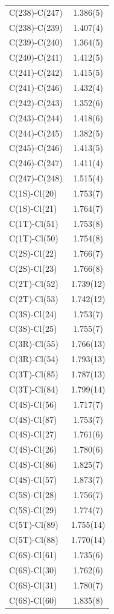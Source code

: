 \begin{center}
{\begin{supertabular}{p{1.5in}c}
C(238)-C(247) &1.386(5)\\
C(238)-C(239) &1.407(4)\\
C(239)-C(240) &1.364(5)\\
C(240)-C(241) &1.412(5)\\
C(241)-C(242) &1.415(5)\\
C(241)-C(246) &1.432(4)\\
C(242)-C(243) &1.352(6)\\
C(243)-C(244) &1.418(6)\\
C(244)-C(245) &1.382(5)\\
C(245)-C(246) &1.413(5)\\
C(246)-C(247) &1.411(4)\\
C(247)-C(248) &1.515(4)\\
C(1S)-Cl(20) &1.753(7)\\
C(1S)-Cl(21) &1.764(7)\\
C(1T)-Cl(51) &1.753(8)\\
C(1T)-Cl(50) &1.754(8)\\
C(2S)-Cl(22) &1.766(7)\\
C(2S)-Cl(23) &1.766(8)\\
C(2T)-Cl(52) &1.739(12)\\
C(2T)-Cl(53) &1.742(12)\\
C(3S)-Cl(24) &1.753(7)\\
C(3S)-Cl(25) &1.755(7)\\
C(3R)-Cl(55) &1.766(13)\\
C(3R)-Cl(54) &1.793(13)\\
C(3T)-Cl(85) &1.787(13)\\
C(3T)-Cl(84) &1.799(14)\\
C(4S)-Cl(56) &1.717(7)\\
C(4S)-Cl(87) &1.753(7)\\
C(4S)-Cl(27) &1.761(6)\\
C(4S)-Cl(26) &1.780(6)\\
C(4S)-Cl(86) &1.825(7)\\
C(4S)-Cl(57) &1.873(7)\\
C(5S)-Cl(28) &1.756(7)\\
C(5S)-Cl(29) &1.774(7)\\
C(5T)-Cl(89) &1.755(14)\\
C(5T)-Cl(88) &1.770(14)\\
C(6S)-Cl(61) &1.735(6)\\
C(6S)-Cl(30) &1.762(6)\\
C(6S)-Cl(31) &1.780(7)\\
C(6S)-Cl(60) &1.835(8)\\

\end{supertabular}}
\end{center}
